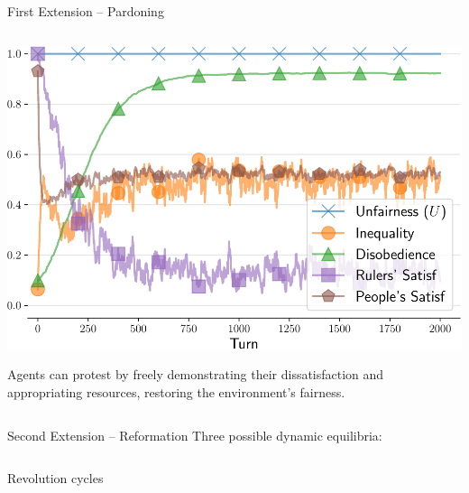 \documentclass[xcolor={table}]{beamer}
\begin{document}
\begin{frame}[fragile=singleslide,t]
\begin{columns}[T]
\begin{column}{.58\textwidth}
\begin{block}{First Extension -- Pardoning}
\begin{columns}[c]
\begin{column}{.4\textwidth}
  \includegraphics[width=0.9\linewidth]{img/timerevolution.pdf}

Agents can protest by freely demonstrating their dissatisfaction and appropriating resources, restoring the environment's fairness.
\end{column}
\end{columns}





\end{block} 


\begin{block}{Second Extension -- Reformation}
Three possible dynamic equilibria:



\begin{columns}[T]
\begin{column}{.333\textwidth}



\begin{center}
Revolution cycles


\end{center}
\end{column}
\end{columns}
\end{block}
\end{column}
\end{columns}
\end{frame}
\end{document}
